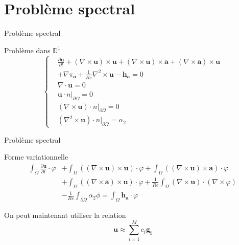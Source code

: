 \documentclass{beamer}
\newcommand{\DD}{{\mathbb{D}}}
\newcommand{\grad}{{\nabla}}
\newcommand{\rot}{{\nabla\times}}
\newcommand{\rott}{{\nabla^2\times}}
\newcommand{\diverg}{{\nabla\cdot}}
\newcommand{\restr}{{\big\rvert_{\partial\Omega}}}
\begin{document}
\section{Problème spectral}
\begin{frame}{Problème spectral}
\begin{block}{Problème dans $\DD^1$}
\[
\left\{
\begin{aligned}
&\frac{\partial \mathbf{u}}{\partial t} + (\rot \mathbf{u})\times \mathbf{u} + (\rot \mathbf{u})\times \mathbf{a} + \left(\rot \mathbf{a}\right)\times \mathbf{u} \\
&+ \grad\pi_\mathbf{a} + \frac{1}{Re}\rott \mathbf{u} - \mathbf{h_a} = 0\\
&\diverg \mathbf{u} = 0\\
&\mathbf{u}\cdot n\restr = 0\\
&(\rot \mathbf{u})\cdot n\restr = 0\\
&(\rott \mathbf{u})\cdot n\restr = \alpha_2
\end{aligned}
\right.
\]
\end{block}
\end{frame}

\begin{frame}{Problème spectral}
\begin{block}{Forme variationnelle}
\begin{align*}
\int_\Omega \frac{\partial \mathbf{u}}{\partial t}\cdot \varphi &+ \int_\Omega ((\rot \mathbf{u})\times \mathbf{u})\cdot \varphi + \int_\Omega ((\rot \mathbf{u})\times \mathbf{a})\cdot\varphi \\
&+ \int_\Omega ((\rot \mathbf{a})\times \mathbf{u})\cdot\varphi + \frac{1}{Re}\int_\Omega (\rot \mathbf{u})\cdot(\rot\varphi) \\
&-\frac{1}{Re}\int_{\partial\Omega} \alpha_2\phi = \int_\Omega \mathbf{h_a}\cdot\varphi
\end{align*}
\end{block}
On peut maintenant utiliser la relation 
\[
\mathbf{u}\approx\sum_{i=1}^M c_i\mathbf{g_i}
\]
\end{frame}
\end{document}
